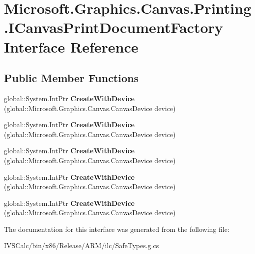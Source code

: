 \hypertarget{interface_microsoft_1_1_graphics_1_1_canvas_1_1_printing_1_1_i_canvas_print_document_factory}{}\section{Microsoft.\+Graphics.\+Canvas.\+Printing.\+I\+Canvas\+Print\+Document\+Factory Interface Reference}
\label{interface_microsoft_1_1_graphics_1_1_canvas_1_1_printing_1_1_i_canvas_print_document_factory}
\subsection*{Public Member Functions}
\begin{DoxyCompactItemize}
\item 
\mbox{\label{interface_microsoft_1_1_graphics_1_1_canvas_1_1_printing_1_1_i_canvas_print_document_factory_a166da2ecb7cc8019fe9ec61739737975}} 
global\+::\+System.\+Int\+Ptr {\bfseries Create\+With\+Device} (global\+::\+Microsoft.\+Graphics.\+Canvas.\+Canvas\+Device device)
\item 
\mbox{\label{interface_microsoft_1_1_graphics_1_1_canvas_1_1_printing_1_1_i_canvas_print_document_factory_a166da2ecb7cc8019fe9ec61739737975}} 
global\+::\+System.\+Int\+Ptr {\bfseries Create\+With\+Device} (global\+::\+Microsoft.\+Graphics.\+Canvas.\+Canvas\+Device device)
\item 
\mbox{\label{interface_microsoft_1_1_graphics_1_1_canvas_1_1_printing_1_1_i_canvas_print_document_factory_a166da2ecb7cc8019fe9ec61739737975}} 
global\+::\+System.\+Int\+Ptr {\bfseries Create\+With\+Device} (global\+::\+Microsoft.\+Graphics.\+Canvas.\+Canvas\+Device device)
\item 
\mbox{\label{interface_microsoft_1_1_graphics_1_1_canvas_1_1_printing_1_1_i_canvas_print_document_factory_a166da2ecb7cc8019fe9ec61739737975}} 
global\+::\+System.\+Int\+Ptr {\bfseries Create\+With\+Device} (global\+::\+Microsoft.\+Graphics.\+Canvas.\+Canvas\+Device device)
\item 
\mbox{\label{interface_microsoft_1_1_graphics_1_1_canvas_1_1_printing_1_1_i_canvas_print_document_factory_a166da2ecb7cc8019fe9ec61739737975}} 
global\+::\+System.\+Int\+Ptr {\bfseries Create\+With\+Device} (global\+::\+Microsoft.\+Graphics.\+Canvas.\+Canvas\+Device device)
\end{DoxyCompactItemize}


The documentation for this interface was generated from the following file\+:\begin{DoxyCompactItemize}
\item 
I\+V\+S\+Calc/bin/x86/\+Release/\+A\+R\+M/ilc/Safe\+Types.\+g.\+cs\end{DoxyCompactItemize}
